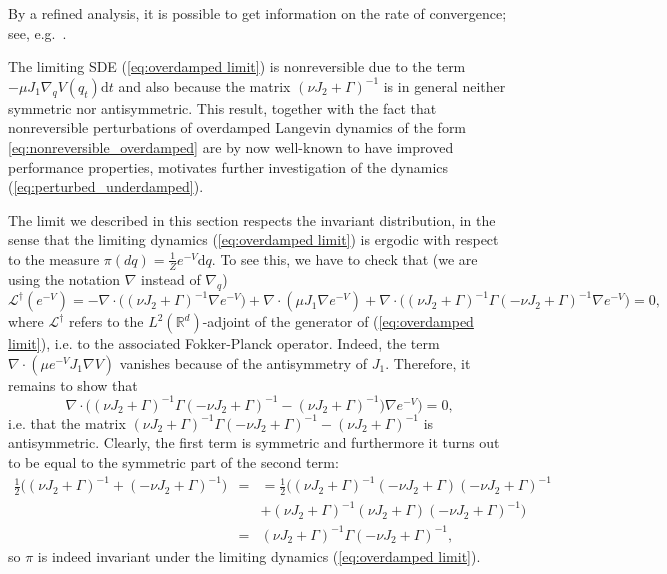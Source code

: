 \begin{remark}
	By a refined analysis, it is possible to get information on the rate of convergence; see, e.g.~\cite{PavlSt03,PavSt05a}.
\end{remark}
The limiting SDE (\ref{eq:overdamped limit}) is nonreversible due to the term $-\mu J_1 \nabla_q V(q_t)\mathrm{d}t$ and also because the
matrix $(\nu J_{2}+\Gamma)^{-1}$ is in general neither symmetric
nor antisymmetric.
This result, together with the fact that nonreversible perturbations
of overdamped Langevin dynamics of the form \eqref{eq:nonreversible_overdamped} are by now well-known to have improved
performance properties, motivates further investigation of the dynamics
(\ref{eq:perturbed_underdamped}).

\begin{remark}
	The limit we described in this section respects the invariant distribution,
	in the sense that the limiting dynamics (\ref{eq:overdamped limit})
	is ergodic with respect to the measure $\pi(dq)=\frac{1}{Z}e^{-V}\mathrm{d}q.$
	To see this, we have to check that (we are using the notation $\nabla$ instead of $\nabla_q$) 
	\[
	\mathcal{L}^{\dagger}(e^{-V})=-\nabla\cdot\big((\nu J_{2}+\Gamma)^{-1}\nabla e^{-V}\big)+\nabla\cdot(\mu J_{1}\nabla e^{-V})+\nabla\cdot\big((\nu J_{2}+\Gamma)^{-1}\Gamma(-\nu J_{2}+\Gamma)^{-1}\nabla e^{-V}\big)=0,
	\]
	where $\mathcal{L}^{\dagger}$ refers to the $L^{2}(\mathbb{R}^{d})$-adjoint
	of the generator of (\ref{eq:overdamped limit}), i.e. to the associated Fokker-Planck operator. Indeed, the term
	$\nabla\cdot(\mu e^{-V}J_{1}\nabla V)$ vanishes because of the
	antisymmetry of $J_{1}.$ Therefore, it remains to show that 
	\[
	\nabla\cdot\big((\nu J_{2}+\Gamma)^{-1}\Gamma(-\nu J_{2}+\Gamma)^{-1}-(\nu J_{2}+\Gamma)^{-1}\big)\nabla e^{-V}\big)=0,
	\]
	i.e. that the matrix $(\nu J_{2}+\Gamma)^{-1}\Gamma(-\nu J_{2}+\Gamma)^{-1}-(\nu J_{2}+\Gamma)^{-1}$
	is antisymmetric. Clearly, the first term is symmetric and furthermore
	it turns out to be equal to the symmetric part of the second term:
		\begin{eqnarray*}
 \frac{1}{2}\big((\nu J_{2}+\Gamma)^{-1}+(-\nu J_{2}+\Gamma)^{-1}\big) & = &
	  =\frac{1}{2}\big((\nu J_{2}+\Gamma)^{-1}(-\nu J_{2}+\Gamma)(-\nu J_{2}+\Gamma)^{-1}  \\ && + (\nu J_{2}+\Gamma)^{-1}(\nu J_{2}+\Gamma)(-\nu J_{2}+\Gamma)^{-1}\big)\\
	& = & (\nu J_{2}+\Gamma)^{-1}\Gamma(-\nu J_{2}+\Gamma)^{-1},
		\end{eqnarray*}
	so $\pi$ is indeed invariant under the limiting dynamics (\ref{eq:overdamped limit}).
\end{remark}
	

